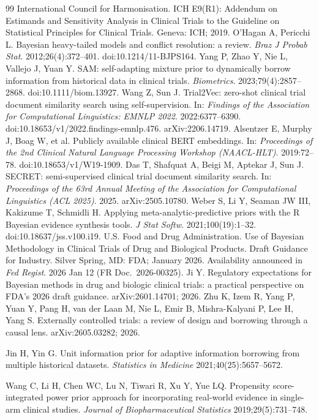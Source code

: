 \documentclass[11pt]{article}
\begin{document}
\begin{thebibliography}{99}
 International Council for Harmonisation. ICH E9(R1): Addendum on
Estimands and Sensitivity Analysis in Clinical Trials to the Guideline on
Statistical Principles for Clinical Trials. Geneva: ICH; 2019.
 O'Hagan A, Pericchi L. Bayesian heavy-tailed models and conflict
resolution: a review. \emph{Braz J Probab Stat}. 2012;26(4):372--401.
doi:10.1214/11-BJPS164.
 Yang P, Zhao Y, Nie L, Vallejo J, Yuan Y. SAM: self-adapting
mixture prior to dynamically borrow information from historical data in clinical
trials. \emph{Biometrics}. 2023;79(4):2857--2868. doi:10.1111/biom.13927.
 Wang Z, Sun J. Trial2Vec: zero-shot clinical trial document
similarity search using self-supervision. In: \emph{Findings of the Association
for Computational Linguistics: EMNLP 2022}. 2022:6377--6390.
doi:10.18653/v1/2022.findings-emnlp.476. arXiv:2206.14719.
 Alsentzer E, Murphy J, Boag W, et al. Publicly available
clinical BERT embeddings. In: \emph{Proceedings of the 2nd Clinical Natural
Language Processing Workshop (NAACL-HLT)}. 2019:72--78.
doi:10.18653/v1/W19-1909.
 Das T, Shafquat A, Beigi M, Aptekar J, Sun J. SECRET:
semi-supervised clinical trial document similarity search. In: \emph{Proceedings
of the 63rd Annual Meeting of the Association for Computational Linguistics
(ACL 2025)}. 2025. arXiv:2505.10780.
 Weber S, Li Y, Seaman JW III, Kakizume T, Schmidli H. Applying
meta-analytic-predictive priors with the R Bayesian evidence synthesis tools.
\emph{J Stat Softw}. 2021;100(19):1--32. doi:10.18637/jss.v100.i19.
 U.S. Food and Drug Administration. Use of Bayesian Methodology
in Clinical Trials of Drug and Biological Products. Draft Guidance for Industry.
Silver Spring, MD: FDA; January 2026. Availability announced in \emph{Fed
Regist}. 2026 Jan 12 (FR Doc.\ 2026-00325).
 Ji Y. Regulatory expectations for Bayesian methods in
drug and biologic clinical trials: a practical perspective on FDA's 2026 draft
guidance. arXiv:2601.14701; 2026.
 Zhu K, Izem R, Yang P, Yuan Y, Pang H, van der Laan M, Nie L,
Emir B, Mishra-Kalyani P, Lee H, Yang S. Externally controlled trials: a
review of design and borrowing through a causal lens. arXiv:2605.03282; 2026.

 Jin H, Yin G. Unit information prior for adaptive information
borrowing from multiple historical datasets. \emph{Statistics in Medicine}
2021;40(25):5657--5672.

 Wang C, Li H, Chen WC, Lu N, Tiwari R, Xu Y, Yue LQ.
Propensity score-integrated power prior approach for incorporating real-world
evidence in single-arm clinical studies. \emph{Journal of Biopharmaceutical
Statistics} 2019;29(5):731--748.


\end{thebibliography}
\end{document}
